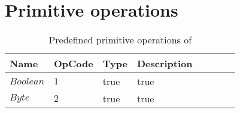 \section{Primitive operations}
\label{sec:appendix:primops}

\begin{table}[h]
    \small
    \begin{tabu}{|l |l |l |l |l |l |l |l|}
     \hline
     \rowfont{\bfseries}
        Name   &   OpCode   &  Type  & Description \\
     \hline
        $Boolean$	&	$1$ 	&	true	&	true		  \\
     \hline
         $Byte$	&	$2$	&	true	& true		\\
    \hline
    \end{tabu}
    \caption{Predefined primitive operations of \langname}
    \label{table:primops}
\end{table}

